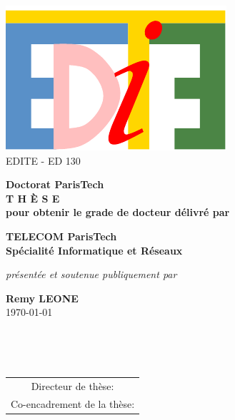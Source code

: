 \vspace{0.cm}
\begin{center}

\includegraphics[scale=0.65]{img/logos/edite.pdf} \\
{\small {EDITE - ED 130}}


\vspace{.5cm}


\vspace{1.0cm}

{\LARGE \textbf{Doctorat ParisTech}}\\
\vspace{1.1cm}
{\LARGE \textbf{T H È S E}}\\
\vspace{0.5cm}
{\normalsize \textbf{pour obtenir le grade de docteur délivré par}}\\

\vspace{.9cm}

{\LARGE \textbf{TELECOM ParisTech}}\\
\vspace{0.6cm}
{\Large \textbf{Spécialité Informatique et Réseaux}}\\

\vspace{.8cm}

{\normalsize \textit{présentée et soutenue publiquement par}}\\
\vspace{0.7cm}

{\Large \textbf{Remy LEONE}}\\
\vspace{0.24cm}
{\normalsize \today}\\

\vfill

\textcolor[RGB]{191,18,56}{
\noindent
{\LARGE \textbf{\myTitle}}\\
}

\vfill~\vfill

{\normalsize
\begin{tabular}{c}
Directeur de thèse: 			\textbf{\JeanLouis}\\
Co-encadrement de la thèse:		\textbf{\Vania}
\end{tabular}
}
\end{center}

